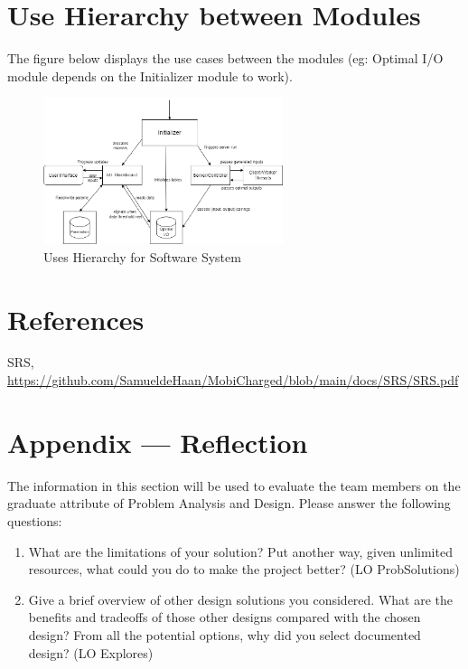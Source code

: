 \documentclass[12pt, titlepage]{article}
\begin{document}
\section{Use Hierarchy between Modules}
The figure below displays the use cases between the modules (eg: Optimal I/O module depends on the Initializer module to work).
\begin{figure}[htp]
  \centering
  \includegraphics[width=7cm]{images/Figure7.png}
  \caption[Uses Hierarchy]{Uses Hierarchy for Software System}
  \label{fig:figure11}
\end{figure}


\section*{References}
SRS, \url{https://github.com/SamueldeHaan/MobiCharged/blob/main/docs/SRS/SRS.pdf}





\newpage

\newpage{}
\section*{Appendix --- Reflection}

The information in this section will be used to evaluate the team members on the graduate attribute of Problem Analysis and Design. Please answer the following questions: 
\par 
\begin{enumerate}
  \item What are the limitations of your solution? Put another way, given unlimited resources, what could you do to make the project better? (LO ProbSolutions) 
  \item Give a brief overview of other design solutions you considered. What are the benefits and tradeoffs of those other designs compared with the chosen design? From all the potential options, why did you select documented design? (LO Explores)
\end{enumerate}
\end{document}
